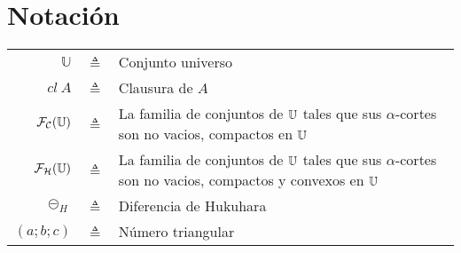 \chapter*{Notación}
\begin{table}[htbp]
  \centering %
  \begin{tabular}{r c p{10cm} }
    \toprule
    $\mathbb{U}$ & $\triangleq$ & Conjunto universo\\
    $cl~A$ &  $\triangleq$ & Clausura de $A$ \\
    $\mathcal{F}_\mathcal{C}(\mathbb U)$ & $\triangleq$ & La familia de conjuntos de $\mathbb U$ tales que sus $\alpha$-cortes son no vacios, compactos en $\mathbb U$ \\
    $\mathcal{F}_\mathcal{H}(\mathbb U)$ & $\triangleq$ & La familia de conjuntos de $\mathbb U$ tales que sus $\alpha$-cortes son no vacios, compactos y convexos en $\mathbb U$ \\
    $\circleddash_H $ & $\triangleq$ & Diferencia de Hukuhara \\
    $(a;b;c)$ & $\triangleq$ & Número triangular \\
    \bottomrule
  \end{tabular}
  \label{tab:notacion}
\end{table}
